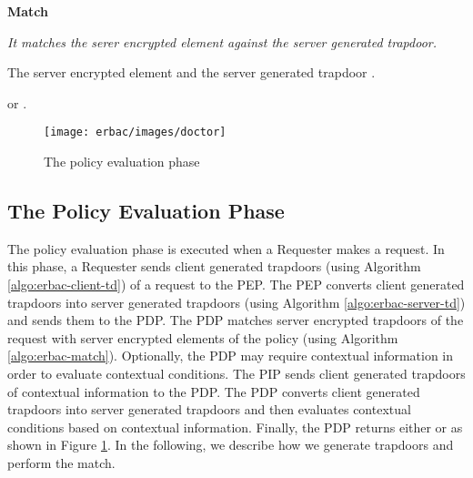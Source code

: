 \documentclass[epsfig,a4paper,11pt,titlepage]{book}
\numberwithin{algorithm}{chapter}
\newcommand{\algofontsize}{\fontsize{11}{12}\selectfont}
\begin{document}
\begin{algorithm} [htp]
{\algofontsize
\caption{\textbf{Match}}

\label{algo:erbac-match}

\begin{algorithmic}[1]

\INPUT \emph{It matches the serer encrypted element against the server generated trapdoor.}

\Require The server encrypted element  and the server generated trapdoor .

\Ensure  or .

\medskip

\If {} \label{line:erbac-match-condition}

	\Return  \label{line:erbac-match-true}
	
\Else

	\Return  \label{line:erbac-match-false}
	
\EndIf

\end{algorithmic}
}
\end{algorithm}


\begin{figure} [htp]
\centering
\texttt{[image: erbac/images/doctor]} \caption{The policy evaluation phase}
\label{fig:erbac-doctor}
\end{figure}


\subsection{The Policy Evaluation Phase}

The policy evaluation phase is executed when a Requester makes a request. In this phase, a Requester sends client generated trapdoors (using Algorithm \ref{algo:erbac-client-td}) of a request to the \gls{PEP}. The \gls{PEP} converts client generated trapdoors into server generated trapdoors (using Algorithm \ref{algo:erbac-server-td}) and sends them to the \gls{PDP}. The \gls{PDP} matches server encrypted trapdoors of the request with server encrypted elements of the policy (using Algorithm \ref{algo:erbac-match}). Optionally, the \gls{PDP} may require contextual information in order to evaluate contextual conditions. The \gls{PIP} sends client generated trapdoors of contextual information to the \gls{PDP}. The \gls{PDP} converts client generated trapdoors into server generated trapdoors and then evaluates contextual conditions based on contextual information. Finally, the \gls{PDP} returns either  or  as shown in Figure \ref{fig:erbac-doctor}. In the following, we describe how we generate trapdoors and perform the match. 
\end{document}

